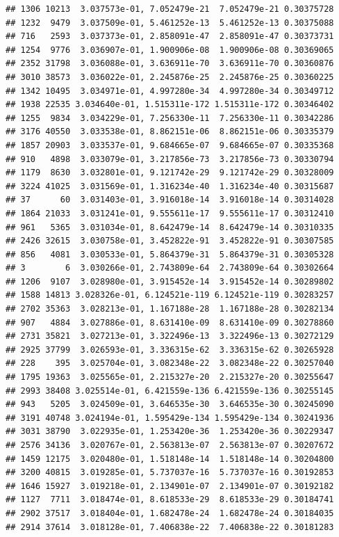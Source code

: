 \documentclass[
]{article}
\begin{document}
\begin{verbatim}
## 1306 10213  3.037573e-01, 7.052479e-21  7.052479e-21 0.30375728
## 1232  9479  3.037509e-01, 5.461252e-13  5.461252e-13 0.30375088
## 716   2593  3.037373e-01, 2.858091e-47  2.858091e-47 0.30373731
## 1254  9776  3.036907e-01, 1.900906e-08  1.900906e-08 0.30369065
## 2352 31798  3.036088e-01, 3.636911e-70  3.636911e-70 0.30360876
## 3010 38573  3.036022e-01, 2.245876e-25  2.245876e-25 0.30360225
## 1342 10495  3.034971e-01, 4.997280e-34  4.997280e-34 0.30349712
## 1938 22535 3.034640e-01, 1.515311e-172 1.515311e-172 0.30346402
## 1255  9834  3.034229e-01, 7.256330e-11  7.256330e-11 0.30342286
## 3176 40550  3.033538e-01, 8.862151e-06  8.862151e-06 0.30335379
## 1857 20903  3.033537e-01, 9.684665e-07  9.684665e-07 0.30335368
## 910   4898  3.033079e-01, 3.217856e-73  3.217856e-73 0.30330794
## 1179  8630  3.032801e-01, 9.121742e-29  9.121742e-29 0.30328009
## 3224 41025  3.031569e-01, 1.316234e-40  1.316234e-40 0.30315687
## 37      60  3.031403e-01, 3.916018e-14  3.916018e-14 0.30314028
## 1864 21033  3.031241e-01, 9.555611e-17  9.555611e-17 0.30312410
## 961   5365  3.031034e-01, 8.642479e-14  8.642479e-14 0.30310335
## 2426 32615  3.030758e-01, 3.452822e-91  3.452822e-91 0.30307585
## 856   4081  3.030533e-01, 5.864379e-31  5.864379e-31 0.30305328
## 3        6  3.030266e-01, 2.743809e-64  2.743809e-64 0.30302664
## 1206  9107  3.028980e-01, 3.915452e-14  3.915452e-14 0.30289802
## 1588 14813 3.028326e-01, 6.124521e-119 6.124521e-119 0.30283257
## 2702 35363  3.028213e-01, 1.167188e-28  1.167188e-28 0.30282134
## 907   4884  3.027886e-01, 8.631410e-09  8.631410e-09 0.30278860
## 2731 35821  3.027213e-01, 3.322496e-13  3.322496e-13 0.30272129
## 2925 37799  3.026593e-01, 3.336315e-62  3.336315e-62 0.30265928
## 228    395  3.025704e-01, 3.082348e-22  3.082348e-22 0.30257040
## 1795 19363  3.025565e-01, 2.215327e-20  2.215327e-20 0.30255647
## 2993 38408 3.025514e-01, 6.421559e-136 6.421559e-136 0.30255145
## 943   5205  3.024509e-01, 3.646535e-30  3.646535e-30 0.30245090
## 3191 40748 3.024194e-01, 1.595429e-134 1.595429e-134 0.30241936
## 3031 38790  3.022935e-01, 1.253420e-36  1.253420e-36 0.30229347
## 2576 34136  3.020767e-01, 2.563813e-07  2.563813e-07 0.30207672
## 1459 12175  3.020480e-01, 1.518148e-14  1.518148e-14 0.30204800
## 3200 40815  3.019285e-01, 5.737037e-16  5.737037e-16 0.30192853
## 1646 15927  3.019218e-01, 2.134901e-07  2.134901e-07 0.30192182
## 1127  7711  3.018474e-01, 8.618533e-29  8.618533e-29 0.30184741
## 2902 37517  3.018404e-01, 1.682478e-24  1.682478e-24 0.30184035
## 2914 37614  3.018128e-01, 7.406838e-22  7.406838e-22 0.30181283

\end{verbatim}
\end{document}
